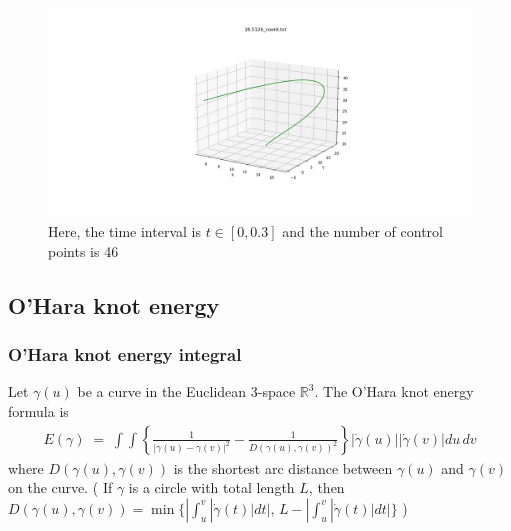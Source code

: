 \documentclass[12pt]{article}
\begin{document}
\begin{figure}[H]
	\centering
	\includegraphics[width=1.0\linewidth]{../lorenz_system/data/lorenz_system_ex2.png}
	\caption{Here, the time interval is $t\in [0,0.3]$ and the number of control points is 46}
\end{figure}





\subsection{O'Hara knot energy}





\subsubsection{O'Hara knot energy integral}


Let $\gamma(u)$ be a curve in the Euclidean 3-space $\mathbb{R}^{3}$.
The O'Hara knot energy formula is
%
\begin{align*}
	E(\gamma) \;=\; \int\int \left\{ \frac{1}{|\gamma(u)-\gamma(v)|^2} - \frac{1}{D(\gamma(u),\gamma(v))^2} \right\}|\dot{\gamma}(u)||\dot{\gamma}(v)| du\, dv
\end{align*}
%
where $D(\gamma (u),\gamma (v))$ is the shortest arc distance between $\gamma (u)$ and $\gamma (v)$ on the curve. 
( If $\gamma$ is a circle with total length $L$, then $D(\gamma (u),\gamma (v)) = \min\{ |\int_u^v |\dot{\gamma}(t)|dt|,\, L - |\int_u^v |\dot{\gamma}(t)|dt| \}$ )
\end{document}
